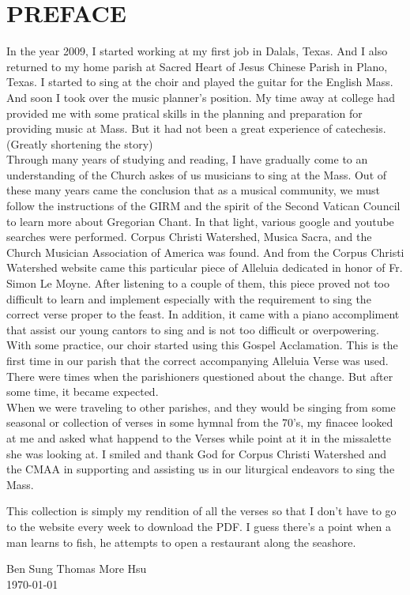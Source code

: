 \documentclass[11pt]{book} %
\begin{document}
\chapter{PREFACE}
\begin{paragraph}
In the year 2009, I started working at my first job in Dalals, Texas. 
And I also returned to my home parish at Sacred Heart of Jesus Chinese
Parish in Plano, Texas. I started to sing at the choir and played the guitar
for the English Mass. And soon I took over the music planner's position.
My time away at college had provided me with some pratical skills in the planning
and preparation for providing music at Mass. But it had not been a great experience
of catechesis. \\

(Greatly shortening the story) \\

Through many years of studying and reading, I have gradually come
to an understanding of the Church askes of us musicians to sing at the Mass.
Out of these many years came the conclusion that as a musical community, we must
follow the instructions of the GIRM and the spirit of the Second Vatican Council
 to learn more about Gregorian Chant. In that light, various google and 
youtube searches were performed. Corpus Christi Watershed, Musica Sacra, and 
the Church Musician Association of America was found. And from the Corpus Christi
Watershed website came this particular piece of Alleluia dedicated in honor of
Fr. Simon Le Moyne. After listening to a couple of them, this piece proved not
too difficult to learn and implement especially with the requirement to sing
the correct verse proper to the feast. In addition, it came with a piano
 accompliment that assist our young cantors to sing and is not too
 difficult or overpowering. With some practice, our choir started using
this Gospel Acclamation. This is the first time in our parish that the
correct accompanying Alleluia Verse was used. There were times when the parishioners
questioned about the change. But after some time, it became expected.\\

When we were traveling to other parishes, and they would be singing from some
seasonal or collection of verses in some hymnal from the 70's, my finacee looked at
me and asked what happend to the Verses while point at it in the missalette she
was looking at. I smiled and thank God for Corpus Christi Watershed and the CMAA
in supporting and assisting us in our liturgical endeavors to sing the Mass.

This collection is simply my rendition of all the verses so that I don't have to
go to the website every week to download the PDF. I guess there's a point when 
a man learns to fish, he attempts to open a restaurant along the seashore.

\begin{center}Ben Sung Thomas More Hsu\\\today
\end{center}

\end{paragraph}
\end{document}
